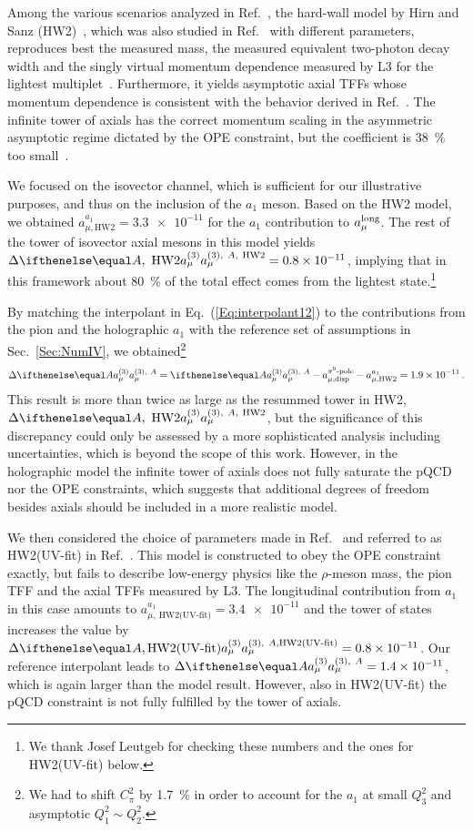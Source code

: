 Among the various scenarios analyzed in Ref.~\cite{HolographyVienna}, the hard-wall model by Hirn and Sanz (HW2)~\cite{Hirn:2005nr}, which was also studied in Ref.~\cite{HolographyItaly} with different parameters, reproduces best the measured mass, the measured equivalent two-photon decay width and the singly virtual momentum dependence measured by L3 for the lightest multiplet~\cite{Achard:2001uu, Achard:2007hm}. Furthermore, it yields asymptotic axial TFFs whose momentum dependence is consistent with the behavior derived in Ref.~\cite{Hoferichter:2020lap}. The infinite tower of axials has the correct momentum scaling in the asymmetric asymptotic regime dictated by the OPE constraint, but the coefficient is \SI{38}{\percent} too small~\cite{HolographyVienna}. 

We focused on the isovector channel, which is sufficient for our illustrative purposes, and thus on the inclusion of the $a_1$ meson. Based on the HW2 model, we obtained $a_{\mu,\text{HW2}}^{a_1} = \num{3.3e-11}$ for the $a_1$ contribution to $a_\mu^\text{long}$. The rest of the tower of isovector axial mesons in this model yields $\Delta \aPion[A,\ \text{HW2}] = \num{0.8e-11}$, implying that in this framework about \SI{80}{\percent} of the total effect comes from the lightest state.\footnote{We thank Josef Leutgeb for checking these numbers and the ones for HW2(UV-fit) below.}

By matching the interpolant in Eq.~(\ref{Eq:interpolant12}) to the contributions from the pion and the holographic $a_1$ with the reference set of assumptions in Sec.~\ref{Sec:NumIV}, we obtained\footnote{We had to shift $C_\pi^2$ by \SI{1.7}{\percent} in order to account for the $a_1$ at small $Q_3^2$ and asymptotic $Q_1^2\sim Q_2^2$.}
\begin{equation}
\Delta \aPion[A] = \aPion[A] - a_{\mu,\text{disp}}^\text{$\pi^0$-pole} - a_{\mu,\text{HW2}}^{a_1} =\num{1.9e-11}\,.
\label{Eq:resAxialHW2}
\end{equation}
This result is more than twice as large as the resummed tower in HW2, $\Delta \aPion[A,\ \text{HW2}]$, but the significance of this discrepancy could only be assessed by a more sophisticated analysis including uncertainties, which is beyond the scope of this work. However, in the holographic model the infinite tower of axials does not fully saturate the pQCD nor the OPE constraints, which suggests that additional degrees of freedom besides axials should be included in a more realistic model.

We then considered the choice of parameters made in Ref.~\cite{HolographyItaly} and referred to as HW2(UV-fit) in Ref.~\cite{HolographyVienna}. This model is constructed to obey the OPE constraint exactly, but fails to describe low-energy physics like the $\rho$-meson mass, the pion TFF and the axial TFFs measured by L3. The longitudinal contribution from $a_1$ in this case amounts to $a_{\mu,\ \text{HW2(UV-fit)}}^{a_1} = \num{3.4e-11}$ and the tower of states increases the value by $\Delta \aPion[A, \text{HW2(UV-fit)}] = \num{0.8e-11}$. Our reference interpolant leads to $\Delta \aPion[A] = \num{1.4e-11}$, which is again larger than the model result. However, also in HW2(UV-fit) the pQCD constraint is not fully fulfilled by the tower of axials.

